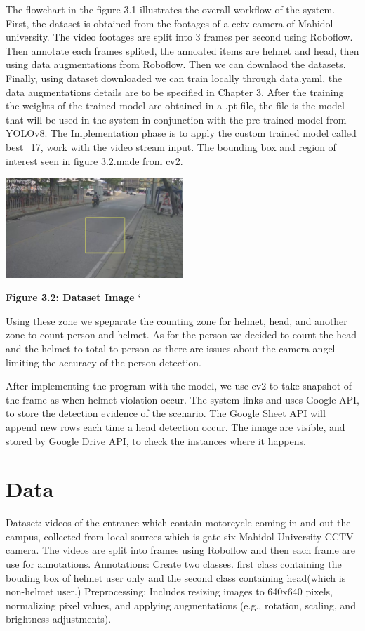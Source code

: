 The flowchart in the figure 3.1 illustrates the overall workflow of the system. First, the dataset is obtained from the footages of a cctv camera of Mahidol university. The video footages are split into 3 frames per second using Roboflow. Then annotate each frames splited, the annoated items are helmet and head, then using data augmentations from Roboflow. Then we can downlaod the datasets. Finally, using dataset downloaded we can train locally through data.yaml, the data augmentations details are to be specified in Chapter 3. After the training the weights of the trained model are obtained in a .pt file, the file is the model that will be used in the system in conjunction with the pre-trained model from YOLOv8. The Implementation phase is to apply the custom trained model called best\_17, work with the video stream input. The bounding box and region of interest seen in figure 3.2.made from cv2. 

	\begin{center}
	\includegraphics[width=0.5\textwidth]{ROI.png}
	
	\vspace{0.5em}
	\textbf{Figure 3.2: Dataset Image}
`\end{center}

Using these zone we speparate the counting zone for helmet, head, and another zone to count person and helmet. As for the person we decided to count the head and the helmet to total to person as there are issues about the camera angel limiting the accuracy of the person detection. 

After implementing the program with the model, we use cv2 to take snapshot of the frame as when helmet violation occur. The system links and uses Google API, to store the detection evidence of the scenario. The Google Sheet API will append new rows each time a head detection occur.  The image are visible, and stored by Google Drive API, to check the instances where it happens.

\section{Data}
Dataset: videos of the entrance which contain motorcycle coming in and out the campus, collected from local sources which is gate six Mahidol University CCTV camera. The videos are split into frames using Roboflow and then each frame are use for annotations.
\newline
\newline
Annotations: Create two classes. first class containing the bouding box of helmet user only and the second class containing head(which is non-helmet user.)
\newline
Preprocessing: Includes resizing images to 640x640 pixels, normalizing pixel values, and applying augmentations (e.g., rotation, scaling, and brightness adjustments).

